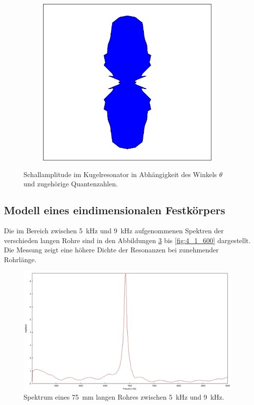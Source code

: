 \begin{figure}
\begin{subfigure}{0.4\textwidth}
\includegraphics[width=\textwidth]{content/messungen/Chapter2new/2_3_5.jpg}
\label{fig:2_3_5}
\end{subfigure}
\caption{Schallamplitude im Kugelresonator in Abhängigkeit des Winkels $\theta$ und zugehörige Quantenzahlen.}
\label{fig:kugelflaechenfunktionen}
\end{figure}
\FloatBarrier
\subsection{Modell eines eindimensionalen Festkörpers}
\label{subsec:Modell eines eindimensionalen Festkörpers}
Die im Bereich zwischen 5~kHz und 9~kHz aufgenommenen Spektren der verschieden langen Rohre sind in den Abbildungen \ref{fig:4_1_75} bis \ref{fig:4_1_600} dargestellt.
Die Messung zeigt eine höhere Dichte der Resonanzen bei zunehmender Rohrlänge.
\begin{figure}
\centering
\includegraphics[width=1\textwidth]{content/messungen/Chapter4/4_1_75mm.jpg}
\caption{Spektrum eines 75~mm langen Rohres zwischen 5~kHz und 9~kHz.}
\label{fig:4_1_75}
\end{figure}


